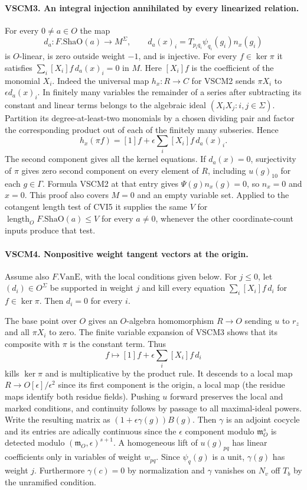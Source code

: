 \paragraph{VSCM3. An integral injection annihilated by every linearized relation.}
\label{claim:VSCM3}
For every $0\ne a\in O$ the map
\[
  d_a:F.\mathrm{ShaO}(a)\longrightarrow M^\Sigma,\qquad
  d_a(x)_i=T_{p_iq_i}\psi_{q_i}(g_i)n_x(g_i)
\]
is $O$-linear, is zero outside weight $-1$, and is injective. For
every $f\in\ker\pi$ it satisfies
$\sum_i[X_i]f\,d_a(x)_i=0$ in $M$. Here $[X_i]f$ is the coefficient
of the monomial $X_i$. Indeed the universal map
$h_x:R\to C$ for VSCM2 sends $\pi X_i$ to $\epsilon d_a(x)_i$.
In finitely many variables the remainder of a series after subtracting
its constant and linear terms belongs to the algebraic ideal
$(X_iX_j:i,j\in\Sigma)$. Partition its degree-at-least-two monomials
by a chosen dividing pair and factor the corresponding product out
of each of the finitely many subseries. Hence
\[
       h_x(\pi f)=[1]f+\epsilon\sum_i[X_i]f\,d_a(x)_i.
\]
The second component gives all the kernel equations. If $d_a(x)=0$,
surjectivity of $\pi$ gives zero second component on every element
of $R$, including $u(g)_{10}$ for each $g\in\Gamma$. Formula VSCM2
at that entry gives $\Psi(g)n_x(g)=0$, so $n_x=0$ and $x=0$.
This proof also covers $M=0$ and an empty variable set. Applied to
the cotangent length test of CVI5 it supplies the same $V$ for
$\operatorname{length}_O F.\mathrm{ShaO}(a)\le V$ for every $a\ne0$,
whenever the other coordinate-count inputs produce that test.

\paragraph{VSCM4. Nonpositive weight tangent vectors at the origin.}
\label{claim:VSCM4}
Assume also $F.\mathrm{VanE}$, with the local conditions
given below. For $j\le0$, let $(d_i)\in O^\Sigma$ be supported in weight
$j$ and kill every equation $\sum_i[X_i]f\,d_i$ for $f\in\ker\pi$.
Then $d_i=0$ for every $i$.

The base point over $O$ gives an $O$-algebra homomorphism $R\to O$
sending $u$ to $r_z$ and all $\pi X_i$ to zero. The finite variable
expansion of VSCM3 shows that its composite with $\pi$ is the constant
term. Thus
\[
     f\longmapsto [1]f+\epsilon\sum_i [X_i]f\,d_i
\]
kills $\ker\pi$ and is multiplicative by the product rule. It descends
to a local map $R\to O[\epsilon]/\epsilon^2$ since its first
component is the origin, a local map (the residue maps identify both
residue fields). Pushing $u$ forward preserves the local and marked
conditions, and continuity follows by passage to all maximal-ideal
powers. Write the resulting matrix as
$(1+\epsilon\gamma(g))B(g)$. Then $\gamma$ is an adjoint cocycle
and its entries are adically continuous since the $\epsilon$ component
modulo $\mathfrak m_O^s$ is detected modulo
$(\mathfrak m_O,\epsilon)^{s+1}$. A homogeneous lift of $u(g)_{pq}$
has linear coefficients only in variables of weight $w_{pq}$.
Since $\psi_q(g)$ is a unit, $\gamma(g)$ has weight $j$.
Furthermore $\gamma(c)=0$ by normalization and $\gamma$ vanishes on
$N_v$ off $T_b$ by the unramified condition.

